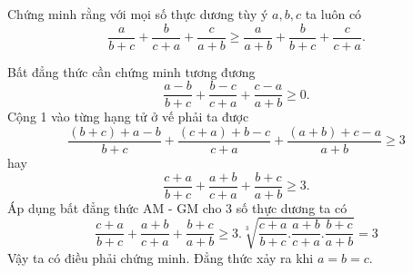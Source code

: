 \begin{problem}
	Chứng minh rằng với mọi số thực dương tùy ý $a, b, c$ ta luôn có
	\[
		\frac{a}{b + c} + \frac{b}{c + a} + \frac{c}{a + b} \ge \frac{a}{a + b} + \frac{b}{b + c} + \frac{c}{c + a}.
	\]
	\solution 

	Bất đẳng thức cần chứng minh tương đương
	\[
		\frac{a - b}{b + c} + \frac{b - c}{c + a} + \frac{c - a}{a + b} \ge 0.
	\]
	Cộng 1 vào từng hạng tử ở vế phải ta được
	\[
		\frac{(b + c) + a - b}{b + c} + \frac{(c + a) + b - c}{c + a} + \frac{(a + b) + c - a}{a + b} \ge 3
	\]
	hay 
	\[
		\frac{c + a}{b + c} + \frac{a + b}{c + a} + \frac{b + c}{a + b} \ge 3.
	\]
	Áp dụng bất đẳng thức AM - GM cho 3 số thực dương ta có
	\[
		\frac{c + a}{b + c} + \frac{a + b}{c + a} + \frac{b + c}{a + b} \ge 
		3.\sqrt[3]{\frac{c + a}{b + c}.\frac{a + b}{c + a}.\frac{b + c}{a + b}} = 3
	\]
	Vậy ta có điều phải chứng minh. Đẳng thức xảy ra khi $a = b = c$.
\end{problem}